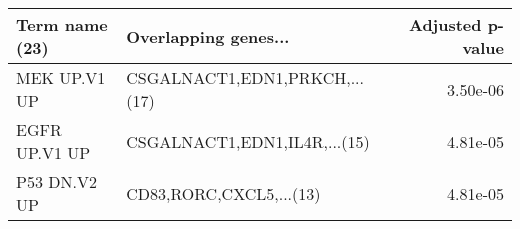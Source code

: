 \begin{tabular}{llr}
\toprule
Term name (23) &          Overlapping genes... &  Adjusted p-value \\
\midrule
  MEK UP.V1 UP & CSGALNACT1,EDN1,PRKCH,...(17) &          3.50e-06 \\
 EGFR UP.V1 UP &  CSGALNACT1,EDN1,IL4R,...(15) &          4.81e-05 \\
  P53 DN.V2 UP &       CD83,RORC,CXCL5,...(13) &          4.81e-05 \\
\bottomrule
\end{tabular}
